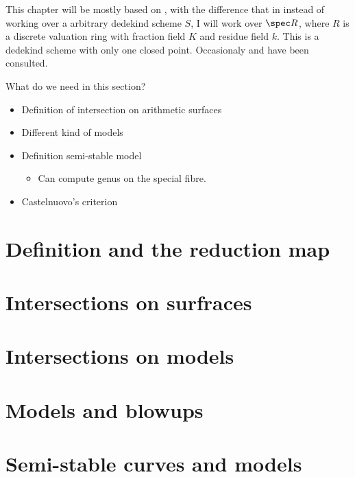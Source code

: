 This chapter will be mostly based on \cite[chap.\ 8, 9, 10]{liuAlgebraicGeometryArithmetic2002}, with the difference that in instead of working over a arbitrary dedekind scheme $S$, I will work over $\spec R$, where $R$ is a discrete valuation ring with fraction field $K$ and residue field $k$. This is a dedekind scheme with only one closed point.  
Occasionaly \cite[appendix A]{hartshorneAlgebraicGeometry1977} and \cite[sec.\ III.7-8]{silvermanAdvancedTopicsArithmetic1994} have been consulted. 


What do we need in this section? 
\begin{itemize}
	\item Definition of intersection on arithmetic surfaces
	\item Different kind of models
	\item Definition semi-stable model
		\begin{itemize}
			\item Can compute genus on the special fibre. 
		\end{itemize}
	\item Castelnuovo's criterion
\end{itemize}

\section{Definition and the reduction map} \label{sec:models}


\section{Intersections on surfraces} \label{sec:intersections_on_surfraces}


\section{Intersections on models} \label{sec:intersections_on_models}


\section{Models and blowups} \label{sec:models_and_blowups}


\section{Semi-stable curves and models} \label{sec:semi-stable_curves_and_models}




